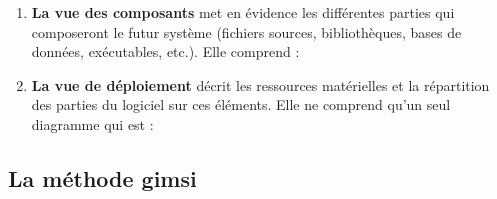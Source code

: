 \begin{enumerate}
\begin{dinglist}{226}
                \end{dinglist}
                \item \textbf{La vue des composants} met en évidence les différentes parties qui
                composeront le futur système (fichiers sources, bibliothèques, bases de données,
                exécutables, etc.). Elle comprend :
                \par
                \par
                \item \textbf{La vue de déploiement} décrit les ressources matérielles et la répartition des parties du
                logiciel sur ces éléments. Elle ne comprend qu’un seul diagramme qui est :
                \par
            \end{enumerate}

        \subsection[La méthode GIMSI]{La méthode \acrshort{gimsi}}

